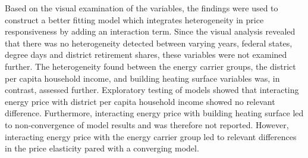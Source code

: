 \documentclass[12pt,twoside]{reedthesis}
\begin{document}
Based on the visual examination of the variables, the findings were used to construct a better fitting model which integrates heterogeneity in price responsiveness by adding an interaction term. Since the visual analysis revealed that there was no heterogeneity detected between varying years, federal states, degree days and district retirement shares, these variables were not examined further. The heterogeneity found between the energy carrier groups, the district per capita household income, and building heating surface variables was, in contrast, assessed further. Exploratory testing of models showed that interacting energy price with district per capita household income showed no relevant difference. Furthermore, interacting energy price with building heating surface led to non-convergence of model results and was therefore not reported. However, interacting energy price with the energy carrier group led to relevant differences in the price elasticity pared with a converging model.
\end{document}
